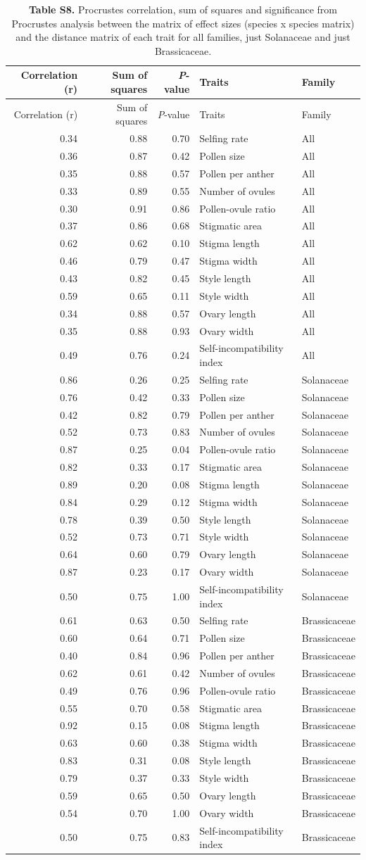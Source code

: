 \documentclass[
  12pt,
]{article}
\begin{document}
\begin{longtable}[]{@{}rrrll@{}}
\caption{\textbf{Table S8.} Procrustes correlation, sum of squares and
significance from Procrustes analysis between the matrix of effect sizes
(species x species matrix) and the distance matrix of each trait for all
families, just Solanaceae and just Brassicaceae.}\tabularnewline
\toprule
Correlation (r) & Sum of squares & \emph{P}-value & Traits &
Family\tabularnewline
\midrule
\endfirsthead
\toprule
Correlation (r) & Sum of squares & \emph{P}-value & Traits &
Family\tabularnewline
\midrule
\endhead
0.34 & 0.88 & 0.70 & Selfing rate & All\tabularnewline
0.36 & 0.87 & 0.42 & Pollen size & All\tabularnewline
0.35 & 0.88 & 0.57 & Pollen per anther & All\tabularnewline
0.33 & 0.89 & 0.55 & Number of ovules & All\tabularnewline
0.30 & 0.91 & 0.86 & Pollen-ovule ratio & All\tabularnewline
0.37 & 0.86 & 0.68 & Stigmatic area & All\tabularnewline
0.62 & 0.62 & 0.10 & Stigma length & All\tabularnewline
0.46 & 0.79 & 0.47 & Stigma width & All\tabularnewline
0.43 & 0.82 & 0.45 & Style length & All\tabularnewline
0.59 & 0.65 & 0.11 & Style width & All\tabularnewline
0.34 & 0.88 & 0.57 & Ovary length & All\tabularnewline
0.35 & 0.88 & 0.93 & Ovary width & All\tabularnewline
0.49 & 0.76 & 0.24 & Self-incompatibility index & All\tabularnewline
0.86 & 0.26 & 0.25 & Selfing rate & Solanaceae\tabularnewline
0.76 & 0.42 & 0.33 & Pollen size & Solanaceae\tabularnewline
0.42 & 0.82 & 0.79 & Pollen per anther & Solanaceae\tabularnewline
0.52 & 0.73 & 0.83 & Number of ovules & Solanaceae\tabularnewline
0.87 & 0.25 & 0.04 & Pollen-ovule ratio & Solanaceae\tabularnewline
0.82 & 0.33 & 0.17 & Stigmatic area & Solanaceae\tabularnewline
0.89 & 0.20 & 0.08 & Stigma length & Solanaceae\tabularnewline
0.84 & 0.29 & 0.12 & Stigma width & Solanaceae\tabularnewline
0.78 & 0.39 & 0.50 & Style length & Solanaceae\tabularnewline
0.52 & 0.73 & 0.71 & Style width & Solanaceae\tabularnewline
0.64 & 0.60 & 0.79 & Ovary length & Solanaceae\tabularnewline
0.87 & 0.23 & 0.17 & Ovary width & Solanaceae\tabularnewline
0.50 & 0.75 & 1.00 & Self-incompatibility index &
Solanaceae\tabularnewline
0.61 & 0.63 & 0.50 & Selfing rate & Brassicaceae\tabularnewline
0.60 & 0.64 & 0.71 & Pollen size & Brassicaceae\tabularnewline
0.40 & 0.84 & 0.96 & Pollen per anther & Brassicaceae\tabularnewline
0.62 & 0.61 & 0.42 & Number of ovules & Brassicaceae\tabularnewline
0.49 & 0.76 & 0.96 & Pollen-ovule ratio & Brassicaceae\tabularnewline
0.55 & 0.70 & 0.58 & Stigmatic area & Brassicaceae\tabularnewline
0.92 & 0.15 & 0.08 & Stigma length & Brassicaceae\tabularnewline
0.63 & 0.60 & 0.38 & Stigma width & Brassicaceae\tabularnewline
0.83 & 0.31 & 0.08 & Style length & Brassicaceae\tabularnewline
0.79 & 0.37 & 0.33 & Style width & Brassicaceae\tabularnewline
0.59 & 0.65 & 0.50 & Ovary length & Brassicaceae\tabularnewline
0.54 & 0.70 & 1.00 & Ovary width & Brassicaceae\tabularnewline
0.50 & 0.75 & 0.83 & Self-incompatibility index &
Brassicaceae\tabularnewline
\bottomrule
\end{longtable}
\end{document}
